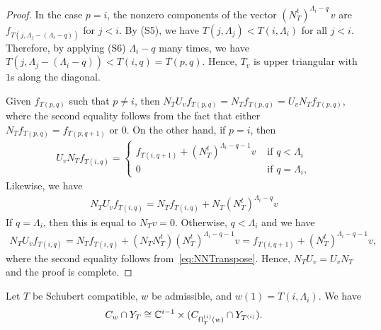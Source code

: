 \documentclass[12pt]{amsart}
\newcommand{\fl}{\mathrm{f\hspace{0.25pt}l}}
\begin{document}
\begin{proof}
In the case $p=i$, the nonzero components of the vector $(N_T^t)^{\Lambda_i-q}\,v$ are $f_{T(j,\Lambda_j-(\Lambda_i-q))}$ for $j<i$. By (S5), we have $T(j,\Lambda_j) < T(i,\Lambda_i)$ for all $j<i$. Therefore, by applying (S6) $\Lambda_i-q$ many times, we have $T(j,\Lambda_j-(\Lambda_i-q)) < T(i,q)=T(p,q)$. Hence, $T_v$ is upper triangular with $1$s along the diagonal.

Given $f_{T(p,q)}$ such that $p\neq i$, then $N_T U_v f_{T(p,q)} = N_T f_{T(p,q)} = U_v N_T f_{T(p,q)}$, where the second equality follows from the fact that either $N_T f_{T(p,q)} = f_{T(p,q+1)}$ or $0$. On the other hand, if $p=i$, then 
\begin{align}
    U_v N_T f_{T(i,q)} = \begin{cases} f_{T(i,q+1)} + (N_T^t)^{\Lambda_i-q-1}v & \text{ if } q<\Lambda_i\\  0 & \text{ if }q = \Lambda_i,\end{cases}
\end{align}
Likewise, we have
\begin{align}
    N_T U_v f_{T(i,q)} = N_T f_{T(i,q)} + N_T(N_T^t)^{\Lambda_i-q}v 
\end{align}
If $q=\Lambda_i$, then this is equal to $N_Tv = 0$. Otherwise, $q<\Lambda_i$ and we have
\begin{align}
    N_T U_v f_{T(i,q)} = N_T f_{T(i,q)} + (N_T N_T^t) (N_T^t)^{\Lambda_i-q-1}v = f_{T(i,q+1)} + (N_T^t)^{\Lambda_i-q-1}v,
\end{align}
where the second equality follows from~\eqref{eq:NNTranspose}. Hence, $N_TU_v = U_vN_T$ and the proof is complete.
\end{proof}


\begin{lemma}\label{lem:CellRecursion}
Let $T$ be Schubert compatible, $w$ be admissible, and $w(1)= T(i,\Lambda_i)$. We have 
\[C_w\cap Y_{T}\cong \mathbb{C}^{i-1}\times (C_{\fl_T^{(i)}(w)}\cap Y_{T^{(i)}}).\]
\end{lemma}
\end{document}
